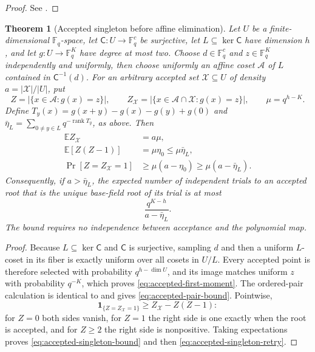 \documentclass[11pt]{article}
\newtheorem{theorem}{Theorem}
\newcommand{\F}{\mathbb F}
\newcommand{\rank}{\operatorname{rank}}
\begin{document}
\begin{proof}
See .
\end{proof}

\begin{theorem}[Accepted singleton before affine elimination]
\label{thm:accepted-singleton}
Let $U$ be a finite-dimensional $\F_q$-space, let
$\mathsf C:U\to\F_q^c$ be surjective, let
$L\subseteq\ker\mathsf C$ have dimension $h$, and let
$g:U\to\F_q^K$ have degree at most two.  Choose $d\in\F_q^c$ and
$z\in\F_q^K$ independently and uniformly, then choose uniformly an affine
coset $\mathcal A$ of $L$ contained in $\mathsf C^{-1}(d)$.  For an arbitrary
accepted set $\mathcal X\subseteq U$ of density
$a=|\mathcal X|/|U|$, put
\[
 Z=|\{x\in\mathcal A:g(x)=z\}|,
 \qquad
 Z_{\mathcal X}=|\{x\in\mathcal A\cap\mathcal X:g(x)=z\}|,
 \qquad \mu=q^{h-K}.
\]
Define $T_y(x)=g(x+y)-g(x)-g(y)+g(0)$ and
$\bar\eta_L=\sum_{0\ne y\in L}q^{-\rank T_y}$, as above.  Then
\begin{align}
 \mathbb E Z_{\mathcal X}&=a\mu,\label{eq:accepted-first-moment}\\
 \mathbb E[Z(Z-1)]&=\mu\eta_0\le\mu\bar\eta_L,\label{eq:accepted-pair-bound}\\
 \Pr[Z=Z_{\mathcal X}=1]
 &\ge \mu(a-\eta_0)
 \ge \mu(a-\bar\eta_L).\label{eq:accepted-singleton-bound}
\end{align}
Consequently, if $a>\bar\eta_L$, the expected number of independent trials to
an accepted root that is the unique base-field root of its trial is at most
\begin{equation}\label{eq:accepted-singleton-retry}
 \frac{q^{K-h}}{a-\bar\eta_L}.
\end{equation}
The bound requires no independence between acceptance and the polynomial map.
\end{theorem}

\begin{proof}
Because $L\subseteq\ker\mathsf C$ and $\mathsf C$ is surjective, sampling
$d$ and then a uniform $L$-coset in its fiber is exactly uniform over all
cosets in $U/L$.  Every accepted point is therefore selected with probability
$q^{h-\dim U}$, and its image matches uniform $z$ with probability $q^{-K}$,
which proves \eqref{eq:accepted-first-moment}.  The ordered-pair calculation is
identical to  and gives
\eqref{eq:accepted-pair-bound}.  Pointwise,
\[
 \mathbf 1_{\{Z=Z_{\mathcal X}=1\}}
 \ge Z_{\mathcal X}-Z(Z-1):
\]
for $Z=0$ both sides vanish, for $Z=1$ the right side is one exactly when the
root is accepted, and for $Z\ge2$ the right side is nonpositive.  Taking
expectations proves \eqref{eq:accepted-singleton-bound} and then
\eqref{eq:accepted-singleton-retry}.
\end{proof}
\end{document}
